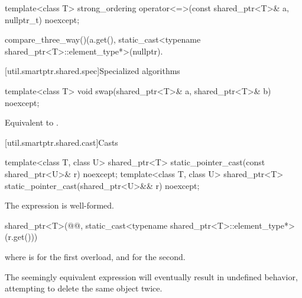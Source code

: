%
\begin{itemdecl}
template<class T>
  strong_ordering operator<=>(const shared_ptr<T>& a, nullptr_t) noexcept;
\end{itemdecl}

\begin{itemdescr}
\pnum
\returns
\begin{codeblock}
compare_three_way()(a.get(), static_cast<typename shared_ptr<T>::element_type*>(nullptr).
\end{codeblock}
\end{itemdescr}

[util.smartptr.shared.spec]{Specialized algorithms}

%
\begin{itemdecl}
template<class T>
  void swap(shared_ptr<T>& a, shared_ptr<T>& b) noexcept;
\end{itemdecl}

\begin{itemdescr}
\pnum
\effects
Equivalent to .
\end{itemdescr}

[util.smartptr.shared.cast]{Casts}

%
\begin{itemdecl}
template<class T, class U>
  shared_ptr<T> static_pointer_cast(const shared_ptr<U>& r) noexcept;
template<class T, class U>
  shared_ptr<T> static_pointer_cast(shared_ptr<U>&& r) noexcept;
\end{itemdecl}

\begin{itemdescr}
\pnum
\mandates
The expression  is well-formed.

\pnum
\returns
\begin{codeblock}
shared_ptr<T>(@@, static_cast<typename shared_ptr<T>::element_type*>(r.get()))
\end{codeblock}
where  is  for the first overload, and
 for the second.

\pnum
\begin{note}
The seemingly equivalent expression
will eventually result in undefined behavior, attempting to delete the
same object twice.
\end{note}
\end{itemdescr}

